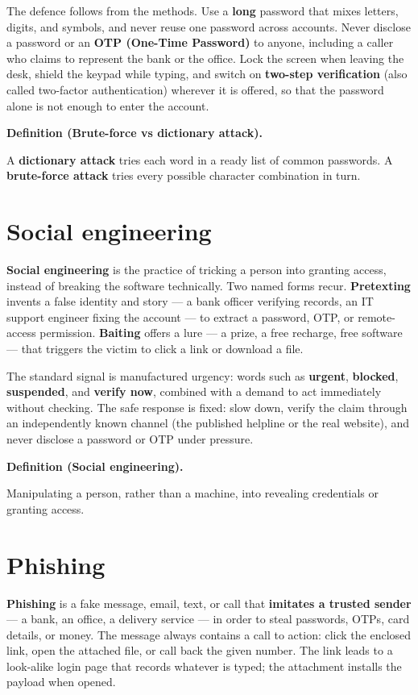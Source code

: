 \documentclass[11pt]{article}
\newenvironment{definitionbox}[1]{%
  \par\noindent\textbf{Definition (#1).}\ \itshape
}{\par\vspace{0.3em}}
\begin{document}
The defence follows from the methods. Use a \textbf{long} password that
mixes letters, digits, and symbols, and never reuse one password across
accounts. Never disclose a password or an \textbf{OTP (One-Time
Password)} to anyone, including a caller who claims to represent the
bank or the office. Lock the screen when leaving the desk, shield the
keypad while typing, and switch on \textbf{two-step verification} (also
called two-factor authentication) wherever it is offered, so that the
password alone is not enough to enter the account.

\begin{definitionbox}{Brute-force vs dictionary attack}
A \textbf{dictionary attack} tries each word in a ready list of common
passwords. A \textbf{brute-force attack} tries every possible character
combination in turn.
\end{definitionbox}

\section{Social engineering}
\textbf{Social engineering} is the practice of tricking a person into
granting access, instead of breaking the software technically. Two
named forms recur. \textbf{Pretexting} invents a false identity and
story --- a bank officer verifying records, an IT support engineer
fixing the account --- to extract a password, OTP, or remote-access
permission. \textbf{Baiting} offers a lure --- a prize, a free recharge,
free software --- that triggers the victim to click a link or download
a file.

The standard signal is manufactured urgency: words such as
\textbf{urgent}, \textbf{blocked}, \textbf{suspended}, and \textbf{verify
now}, combined with a demand to act immediately without checking. The
safe response is fixed: slow down, verify the claim through an
independently known channel (the published helpline or the real
website), and never disclose a password or OTP under pressure.

\begin{definitionbox}{Social engineering}
Manipulating a person, rather than a machine, into revealing
credentials or granting access.
\end{definitionbox}

\section{Phishing}
\textbf{Phishing} is a fake message, email, text, or call that
\textbf{imitates a trusted sender} --- a bank, an office, a delivery
service --- in order to steal passwords, OTPs, card details, or money.
The message always contains a call to action: click the enclosed link,
open the attached file, or call back the given number. The link leads
to a look-alike login page that records whatever is typed; the
attachment installs the payload when opened.
\end{document}

